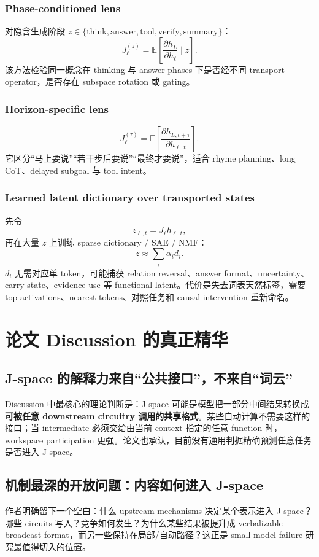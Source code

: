 \documentclass[10.5pt,a4paper]{ctexart}
\begin{document}
\subsubsection{Phase-conditioned lens}
对隐含生成阶段 $z\in\{\mathrm{think,answer,tool,verify,summary}\}$：
\[
J_\ell^{(z)}
=\mathbb E\left[
\frac{\partial h_L}{\partial h_\ell}
\mid z
\right].
\]
该方法检验同一概念在 thinking 与 answer phases 下是否经不同 transport operator，是否存在 subspace rotation 或 gating。

\subsubsection{Horizon-specific lens}
\[
J_\ell^{(\tau)}
=\mathbb E\left[
\frac{\partial h_{L,t+\tau}}{\partial h_{\ell,t}}
\right].
\]
它区分“马上要说”“若干步后要说”“最终才要说”，适合 rhyme planning、long CoT、delayed subgoal 与 tool intent。

\subsubsection{Learned latent dictionary over transported states}
先令
\[
z_{\ell,t}=J_\ell h_{\ell,t},
\]
再在大量 $z$ 上训练 sparse dictionary / SAE / NMF：
\[
z\approx\sum_i\alpha_i d_i.
\]
$d_i$ 无需对应单 token，可能捕获 relation reversal、answer format、uncertainty、carry state、evidence use 等 functional latent。代价是失去词表天然标签，需要 top-activations、nearest tokens、对照任务和 causal intervention 重新命名。

\section{论文 Discussion 的真正精华}

\subsection{J-space 的解释力来自“公共接口”，不来自“词云”}
Discussion 中最核心的理论判断是：J-space 可能是模型把一部分中间结果转换成\textbf{可被任意 downstream circuitry 调用的共享格式}。某些自动计算不需要这样的接口；当 intermediate 必须交给由当前 context 指定的任意 function 时，workspace participation 更强。论文也承认，目前没有通用判据精确预测任意任务是否进入 J-space。

\subsection{机制最深的开放问题：内容如何进入 J-space}
作者明确留下一个空白：什么 upstream mechanisms 决定某个表示进入 J-space？哪些 circuits 写入？竞争如何发生？为什么某些结果被提升成 verbalizable broadcast format，而另一些保持在局部/自动路径？这正是 small-model failure 研究最值得切入的位置。
\end{document}
